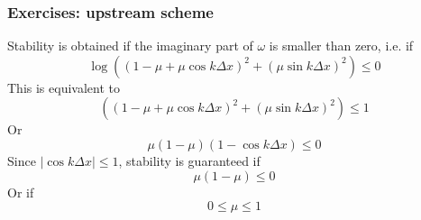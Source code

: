 \documentclass[aspectratio=149,9pt]{beamer}
\begin{document}
\begin{frame}
	\frametitle{Exercises: upstream scheme}
	Stability is obtained if the imaginary part of $\omega$ is smaller than zero, i.e. if
	\begin{equation*}
		\log\left(\left(1-\mu+\mu\cos k\Delta x\right)^2+\left(\mu\sin k\Delta x\right)^2\right) \leq 0
	\end{equation*}
\pause
	This is equivalent to
	\begin{equation*}
		\left(\left(1-\mu+\mu\cos k\Delta x\right)^2+\left(\mu\sin k\Delta x\right)^2\right) \leq 1
	\end{equation*}
\pause
	Or
	\begin{equation*}
		\mu(1-\mu)(1-\cos k\Delta x) \leq 0
	\end{equation*}
\pause
	Since $|\cos k\Delta x|\leq 1$, stability is guaranteed if
	\begin{equation*}
		\mu(1-\mu) \leq 0
	\end{equation*}
\pause
	Or if
	\begin{equation*}
		0\leq \mu\leq 1
	\end{equation*}
\end{frame}
%
%
\end{document}
